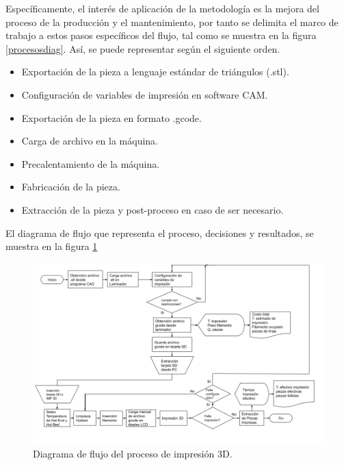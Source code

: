 Específicamente, el interés de aplicación de la metodología es la mejora del proceso de la producción y el mantenimiento, por tanto se delimita el marco de trabajo a estos pasos específicos del flujo, tal como se muestra en la figura \ref{procesosdiag}. Así, se puede representar según el siguiente orden.

\begin{itemize}
\item Exportación de la pieza a lenguaje estándar de triángulos (.stl).
\item Configuración de variables de impresión en software CAM.
\item Exportación de la pieza en formato .gcode.
\item Carga de archivo en la máquina.
\item Precalentamiento de la máquina.
\item Fabricación de la pieza.
\item Extracción de la pieza y post-proceso en caso de ser necesario.
\end{itemize}

El diagrama de flujo que representa el proceso, decisiones y resultados, se muestra en la figura \ref{proceso}

\begin{figure}[H]
\centering
\includegraphics[scale=0.4]{images/proceso.png}
\caption{Diagrama de flujo del proceso de impresión 3D.}
\label{proceso}
\end{figure}

